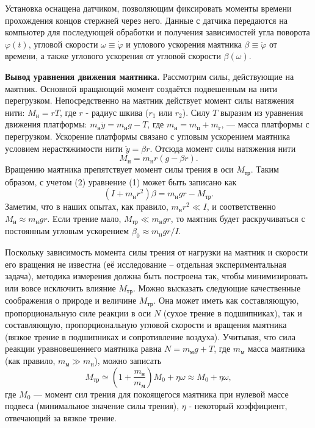Установка оснащена датчиком, позволяющим фиксировать моменты времени прохождения концов стержней через него. Данные с датчика передаются на компьютер для последующей обработки и получения
зависимостей угла поворота $\varphi(t)$, угловой скорости $\omega \equiv \dot{\varphi}$ и углового ускорения маятника $\beta \equiv \ddot{\varphi}$ от времени, а также углового ускорения от
угловой скорости $\beta (\omega)$.

\textbf{Вывод уравнения движения маятника.} Рассмотрим силы, действующие на маятник. Основной вращающий момент создаётся подвешенным на нити перегрузком. Непосредственно на маятник действует момент силы натяжения нити: $M_\text{н} = rT$, где $r$ - радиус шкива ($r_1$ или $r_2$). Силу $T$ выразим из уравнения движения платформы:
$m_\text{н} \ddot y = m_\text{н}g - T$, где $m_\text{н} = m_\text{п} + m_\text{г}$, — масса платформы с перегрузком.
Ускорение платформы связано с угловым ускорением маятника условием нерастяжимости нити $\ddot y = \beta r$. Отсюда момент силы натяжения нити
\begin{equation}
    M_\text{н} = m_\text{н}r\left(g - \beta r\right).
\end{equation}
Вращению маятника препятствует момент силы трения в оси $M_\text{тр}$. Таким образом, с учетом (2) уравнение (1) может быть записано как
\begin{equation}
    \left(I + m_\text{н}r^2\right)\beta = m_\text{н}gr - M_\text{тр}.
\end{equation}
Заметим, что в наших опытах, как правило, $m_\text{н}r^2 \ll I$, и соответственно $M_\text{н} \approx m_\text{н}gr$. Если трение мало, $M_\text{тр} \ll m_\text{н}gr$, то маятник будет раскручиваться с постоянным угловым ускорением $\beta_0 \approx m_\text{н}gr / I$.

Поскольку зависимость момента силы трения от нагрузки на маятник и скорости его вращения не известна (её исследование -- отдельная экспериментальная задача), методика измерения должна быть построена так, чтобы минимизировать или вовсе исключить влияние $M_\text{тр}$. Можно высказать следующие качественные соображения о природе и величине $M_\text{тр}$. Она может иметь как составляющую, пропорциональную силе реакции в оси $N$ (сухое трение в подшипниках), так и составляющую, пропорциональную угловой скорости и вращения маятника (вязкое трение в подшипниках и сопротивление воздуха).
Учитывая, что сила реакции уравновешеннего маятника равна
$N = m_\text{м}g + T$, где $m_\text{м}$ масса маятника (как правило, $m_\text{м} \gg m_\text{н}$), можно записать
\begin{equation}
    M_\text{тр} \simeq \left(1 + \frac{m_\text{н}}{m_\text{м}}\right) M_0 + \eta \omega \approx M_0 + \eta \omega,
\end{equation}
где $M_0$ — момент сил трения для покоящегося маятника при нулевой массе подвеса (минимальное значение силы трения), $\eta$ - некоторый коэффициент, отвечающий за вязкое трение.

